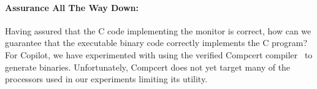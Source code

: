 \paragraph{Assurance All The Way Down:} 
Having assured that the C code implementing the monitor is correct,
how can we guarantee that the executable binary code correctly
implements the C program?  For Copilot, we have experimented
with using the verified Compcert compiler~\cite{leroy} to generate
binaries.  Unfortunately, Compcert does not yet target many of the
processors used in our experiments limiting its utility.




